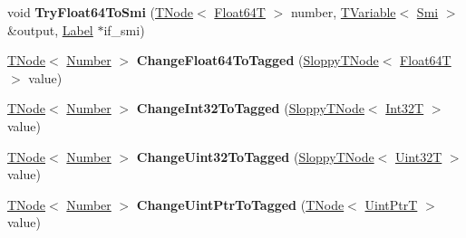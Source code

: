 \begin{DoxyCompactItemize}
\item 
\mbox{\label{classv8_1_1internal_1_1CodeStubAssembler_a1f84eb8a8efc84cb3b36c602af04f664}} 
void {\bfseries Try\+Float64\+To\+Smi} (\mbox{\hyperlink{classv8_1_1internal_1_1compiler_1_1TNode}{T\+Node}}$<$ \mbox{\hyperlink{structv8_1_1internal_1_1Float64T}{Float64T}} $>$ number, \mbox{\hyperlink{classv8_1_1internal_1_1compiler_1_1TypedCodeAssemblerVariable}{T\+Variable}}$<$ \mbox{\hyperlink{classv8_1_1internal_1_1Smi}{Smi}} $>$ \&output, \mbox{\hyperlink{classv8_1_1internal_1_1compiler_1_1CodeAssemblerLabel}{Label}} $\ast$if\+\_\+smi)
\item 
\mbox{\label{classv8_1_1internal_1_1CodeStubAssembler_afe58a567801449ce481afc2c98c7ac73}} 
\mbox{\hyperlink{classv8_1_1internal_1_1compiler_1_1TNode}{T\+Node}}$<$ \mbox{\hyperlink{structv8_1_1internal_1_1UnionT}{Number}} $>$ {\bfseries Change\+Float64\+To\+Tagged} (\mbox{\hyperlink{classv8_1_1internal_1_1compiler_1_1SloppyTNode}{Sloppy\+T\+Node}}$<$ \mbox{\hyperlink{structv8_1_1internal_1_1Float64T}{Float64T}} $>$ value)
\item 
\mbox{\label{classv8_1_1internal_1_1CodeStubAssembler_ac7f12c3075f4ea4e50e3b9e5e52e5513}} 
\mbox{\hyperlink{classv8_1_1internal_1_1compiler_1_1TNode}{T\+Node}}$<$ \mbox{\hyperlink{structv8_1_1internal_1_1UnionT}{Number}} $>$ {\bfseries Change\+Int32\+To\+Tagged} (\mbox{\hyperlink{classv8_1_1internal_1_1compiler_1_1SloppyTNode}{Sloppy\+T\+Node}}$<$ \mbox{\hyperlink{structv8_1_1internal_1_1Int32T}{Int32T}} $>$ value)
\item 
\mbox{\label{classv8_1_1internal_1_1CodeStubAssembler_ae177013373ad9690c88949f57d6da966}} 
\mbox{\hyperlink{classv8_1_1internal_1_1compiler_1_1TNode}{T\+Node}}$<$ \mbox{\hyperlink{structv8_1_1internal_1_1UnionT}{Number}} $>$ {\bfseries Change\+Uint32\+To\+Tagged} (\mbox{\hyperlink{classv8_1_1internal_1_1compiler_1_1SloppyTNode}{Sloppy\+T\+Node}}$<$ \mbox{\hyperlink{structv8_1_1internal_1_1Uint32T}{Uint32T}} $>$ value)
\item 
\mbox{\label{classv8_1_1internal_1_1CodeStubAssembler_a15839767aa176b77bc5a38865becad93}} 
\mbox{\hyperlink{classv8_1_1internal_1_1compiler_1_1TNode}{T\+Node}}$<$ \mbox{\hyperlink{structv8_1_1internal_1_1UnionT}{Number}} $>$ {\bfseries Change\+Uint\+Ptr\+To\+Tagged} (\mbox{\hyperlink{classv8_1_1internal_1_1compiler_1_1TNode}{T\+Node}}$<$ \mbox{\hyperlink{structv8_1_1internal_1_1UintPtrT}{Uint\+PtrT}} $>$ value)

\end{DoxyCompactItemize}
